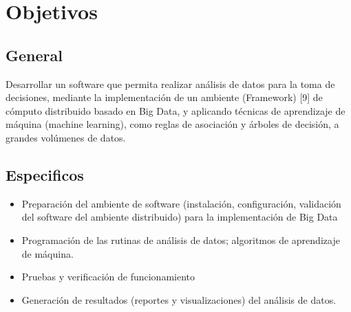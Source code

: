 
\section{Objetivos}
\subsection{General}
Desarrollar un software que permita realizar análisis de datos para la toma de decisiones, mediante la implementación de un
ambiente (Framework) [9] de cómputo distribuido basado en Big Data, y aplicando técnicas de aprendizaje de máquina (machine
learning), como reglas de asociación y árboles de decisión, a grandes volúmenes de datos.
\subsection{Especificos}
\begin{itemize}
\item Preparación del ambiente de software (instalación, configuración, validación del software del ambiente distribuido) para la
implementación de Big Data
\item Programación de las rutinas de análisis de datos; algoritmos de aprendizaje de máquina.
\item Pruebas y verificación de funcionamiento
\item Generación de resultados (reportes y visualizaciones) del análisis de datos.
\end{itemize}